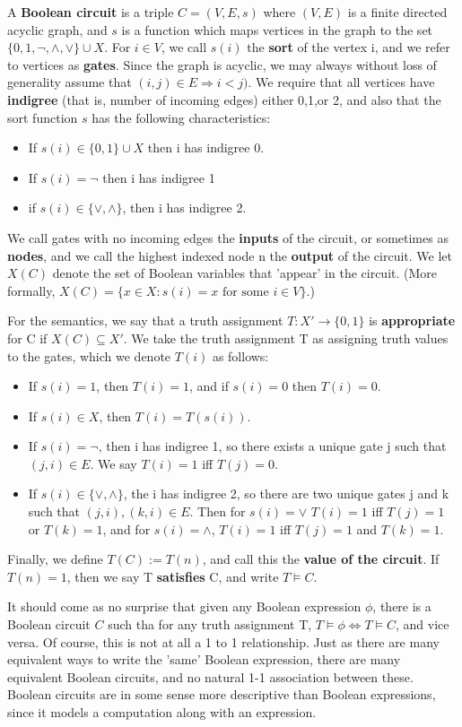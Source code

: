 \begin{definition}
    A \textbf{Boolean circuit} is a triple $C=(V,E,s)$ where $(V,E)$ is a finite directed acyclic graph, and $s$ is a function which maps vertices in the graph to the set $\{0,1,\neg,\wedge,\vee\} \cup X$. For $i \in V$, we call $s(i)$ the \textbf{sort} of the vertex i, and we refer to vertices as \textbf{gates}. Since the graph is acyclic, we may always without loss of generality assume that $(i,j) \in E \Rightarrow i<j)$. We require that all vertices have \textbf{indigree} (that is, number of incoming edges) either 0,1,or 2, and also that the sort function $s$ has the following characteristics:
    \begin{itemize}
        \item If $s(i) \in \{0,1\}\cup X$ then i has indigree 0.
        \item If $s(i) = \neg$ then i has indigree 1
        \item if $s(i) \in \{\vee,\wedge\}$, then i has indigree 2. 
    \end{itemize}
    We call gates with no incoming edges the \textbf{inputs} of the circuit, or sometimes as \textbf{nodes}, and we call the highest indexed node n the \textbf{output} of the circuit. We let $X(C)$ denote the set of Boolean variables that 'appear' in the circuit. (More formally, $X(C) = \{x \in X: s(i)=x\textrm{ for some } i\in V\}$.)
    \par For the semantics, we say that a truth assignment $T:X' \to \{0,1\}$ is \textbf{appropriate} for C if $X(C) \subseteq X'$. We take the truth assignment T as assigning truth values to the gates, which we denote $T(i)$ as follows:
    \begin{itemize}
        \item If $s(i)=1$, then $T(i)=1$, and if $s(i)=0$ then $T(i)=0$.
        \item If $s(i) \in X$, then $T(i)=T(s(i))$.
        \item If $s(i) = \neg$, then i has indigree 1, so there exists a unique gate j such that $(j,i) \in E$. We say $T(i)=1$ iff $T(j)=0$.
        \item If $s(i) \in \{\vee,\wedge\}$, the i has indigree 2, so there are two unique gates j and k such that $(j,i),(k,i) \in E$. Then for $s(i)=\vee$ $T(i)=1$ iff $T(j)=1$ or $T(k)=1$, and for $s(i)=\wedge$, $T(i)=1$ iff $T(j)=1$ and $T(k)=1$.
    \end{itemize}
    Finally, we define $T(C) := T(n)$, and call this the \textbf{value of the circuit}. If $T(n)=1$, then we say T \textbf{satisfies} C, and write $T \models C$.
\end{definition}
\par It should come as no surprise that given any Boolean expression $\phi$, there is a Boolean circuit $C$ such tha for any truth assignment T, $T \models \phi \iff T \models C$, and vice versa. Of course, this is not at all a 1 to 1 relationship. Just as there are many equivalent ways to write the 'same' Boolean expression, there are many equivalent Boolean circuits, and no natural 1-1 association between these. Boolean circuits are in some sense more descriptive than Boolean expressions, since it models a computation along with an expression.

